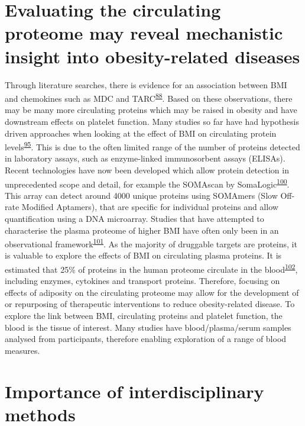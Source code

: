 \documentclass[11pt,twoside]{bristolthesis}
\begin{document}
\hypertarget{evaluating-the-circulating-proteome-may-reveal-mechanistic-insight-into-obesity-related-diseases}{%
\section{Evaluating the circulating proteome may reveal mechanistic insight into obesity-related diseases}\label{evaluating-the-circulating-proteome-may-reveal-mechanistic-insight-into-obesity-related-diseases}}

Through literature searches, there is evidence for an association between BMI and chemokines such as MDC and TARC\textsuperscript{\protect\hyperlink{ref-Kitahara2014}{88}}. Based on these observations, there may be many more circulating proteins which may be raised in obesity and have downstream effects on platelet function. Many studies so far have had hypothesis driven approaches when looking at the effect of BMI on circulating protein levels\textsuperscript{\protect\hyperlink{ref-Timpson2011}{95}}. This is due to the often limited range of the number of proteins detected in laboratory assays, such as enzyme-linked immunosorbent assays (ELISAs). Recent technologies have now been developed which allow protein detection in unprecedented scope and detail, for example the SOMAscan by SomaLogic\textsuperscript{\protect\hyperlink{ref-Gold2012}{100}}. This array can detect around 4000 unique proteins using SOMAmers (Slow Off-rate Modified Aptamers), that are specific for individual proteins and allow quantification using a DNA microarray. Studies that have attempted to characterise the plasma proteome of higher BMI have often only been in an observational framework\textsuperscript{\protect\hyperlink{ref-Cominetti2018}{101}}. As the majority of druggable targets are proteins, it is valuable to explore the effects of BMI on circulating plasma proteins. It is estimated that 25\% of proteins in the human proteome circulate in the blood\textsuperscript{\protect\hyperlink{ref-Imming2006}{102}}, including enzymes, cytokines and transport proteins. Therefore, focusing on effects of adiposity on the circulating proteome may allow for the development of or repurposing of therapeutic interventions to reduce obesity-related disease. To explore the link between BMI, circulating proteins and platelet function, the blood is the tissue of interest. Many studies have blood/plasma/serum samples analysed from participants, therefore enabling exploration of a range of blood measures.

\hypertarget{importance-of-interdisciplinary-methods}{%
\section{Importance of interdisciplinary methods}\label{importance-of-interdisciplinary-methods}}
\end{document}

